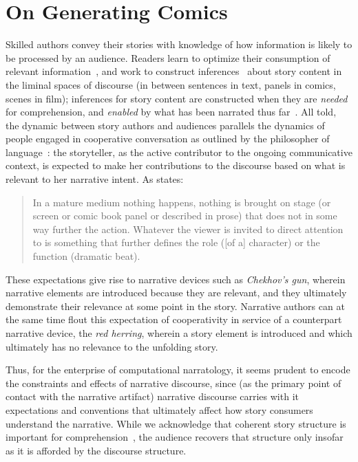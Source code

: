 \section{On Generating Comics}

Skilled authors convey their stories with knowledge of how information is
likely to be processed by an audience.  Readers learn to optimize their
consumption of relevant information~\cite{pirolli2007information}, and work
to construct inferences~\cite{magliano2016filling} about story content in
the liminal spaces of discourse (in between sentences in text, panels in
comics, scenes in film); inferences for story content are constructed when
they are \emph{needed} for comprehension, and \emph{enabled} by what has
been narrated thus far~\cite{myers1987degree}. All told, the dynamic
between story authors and audiences parallels the dynamics of people
engaged in cooperative conversation as outlined by the philosopher of
language~: the storyteller, as the active contributor
to the ongoing communicative context, is expected to make her contributions
to the discourse based on what is relevant to her narrative intent. 
As  states:
%
\begin{quote} 
	In a mature medium nothing happens, nothing is brought on stage (or screen 
	or comic book panel or described in prose) that does not in some way further 
	the action. Whatever the viewer is invited to direct attention to is
	something that further defines the role ([of a] character) or the function 
	(dramatic beat). 
	\end{quote}
%
These expectations give rise to narrative devices such as \emph{Chekhov's
gun}, wherein narrative elements are introduced because they are relevant, 
and they ultimately demonstrate their relevance at some point in the story.
Narrative authors can at the same time flout this expectation of 
cooperativity in service of a counterpart narrative device, the 
\emph{red herring}, wherein a story element is introduced and which
ultimately has no relevance to the unfolding story.

Thus, for the enterprise of computational narratology, it seems prudent to
encode the constraints and effects of narrative discourse, since (as the
primary point of contact with the narrative artifact) narrative discourse
carries with it expectations and conventions that ultimately affect how
story consumers understand the narrative. While we acknowledge that
coherent story structure is important for
comprehension~\cite{graesser2002how}, the audience recovers that structure
only insofar as it is afforded by the discourse structure. 

